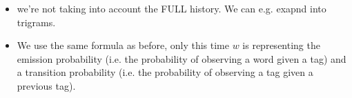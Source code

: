 \documentclass[11pt]{article}
\begin{document}
\begin{minipage}[l]{.5\linewidth}
    \begin{figure}[H]
        \centering
    \end{figure}    
\end{minipage}\hfill
\begin{minipage}[r]{.48\linewidth}
    \begin{itemize}
        \item we're not taking into account the FULL history. We can e.g. exapnd into trigrams.
    \end{itemize}
\end{minipage}

\begin{minipage}[l]{.5\linewidth}
    \begin{figure}[H]
        \centering
    \end{figure}    
\end{minipage}\hfill
\begin{minipage}[r]{.48\linewidth}
    \begin{itemize}
        \item We use the same formula as before, only this time $w$ is representing the emission probability (i.e. the probability of observing a word given a tag) and a transition probability (i.e. the probability of observing a tag given a previous tag).
    \end{itemize}
\end{minipage}
\end{document}
